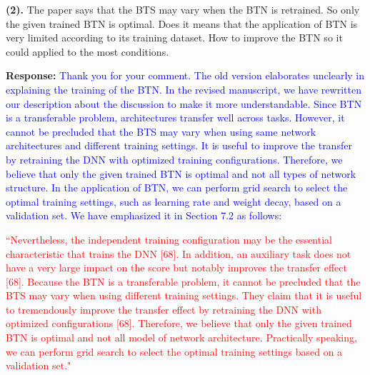 \documentclass[12pt,journal,onecolumn]{IEEEtran}
\begin{document}
%

\textbf{(2).} The paper says that the BTS may vary when the BTN is retrained. 
So only the given trained BTN is optimal. 
Does it means that the application of BTN is very limited according to its training dataset. 
How to improve the BTN so it could applied to the most conditions. 

\textbf{Response:} \textcolor{blue}{Thank you for your comment. 
The old version elaborates unclearly in explaining the training of the BTN. 
In the revised manuscript, we have rewritten our description about the discussion to make it more understandable.
Since BTN is a transferable problem, architectures transfer well across tasks.
However, it cannot be precluded that the BTS may vary when using same network architectures and different training settings. 
It is useful to improve the transfer by retraining the DNN with optimized training configurations. 
Therefore, we believe that only the given trained BTN is optimal and not all types of network structure.
In the application of BTN, we can perform grid search to select the optimal training settings, such as learning rate and weight decay, based on a validation set.
We have emphasized it in Section 7.2 as follows:
}

\textcolor{red}{
``Nevertheless, the independent training configuration may be the essential characteristic that trains the DNN [68]. In addition, an auxiliary task does not have a very large impact on the score but notably improves the transfer effect [68]. 
Because the BTN is a transferable problem, it cannot be precluded that the BTS may vary when using different training settings. 
They claim that it is useful to tremendously improve the transfer effect by retraining the DNN with optimized configurations [68].
Therefore, we believe that only the given trained
BTN is optimal and not all model of network architecture. 
Practically speaking, we can perform grid search to select the optimal training settings based on a validation set."
} \\
\end{document}
